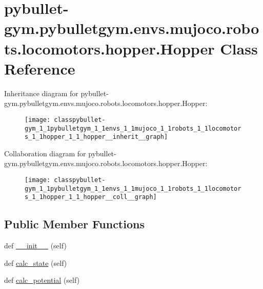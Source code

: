 \hypertarget{classpybullet-gym_1_1pybulletgym_1_1envs_1_1mujoco_1_1robots_1_1locomotors_1_1hopper_1_1_hopper}{}\section{pybullet-\/gym.pybulletgym.\+envs.\+mujoco.\+robots.\+locomotors.\+hopper.\+Hopper Class Reference}
\label{classpybullet-gym_1_1pybulletgym_1_1envs_1_1mujoco_1_1robots_1_1locomotors_1_1hopper_1_1_hopper}


Inheritance diagram for pybullet-\/gym.pybulletgym.\+envs.\+mujoco.\+robots.\+locomotors.\+hopper.\+Hopper\+:
\nopagebreak
\begin{figure}[H]
\begin{center}
\leavevmode
\texttt{[image: classpybullet-gym\_1\_1pybulletgym\_1\_1envs\_1\_1mujoco\_1\_1robots\_1\_1locomotors\_1\_1hopper\_1\_1\_hopper\_\_inherit\_\_graph]}
\end{center}
\end{figure}


Collaboration diagram for pybullet-\/gym.pybulletgym.\+envs.\+mujoco.\+robots.\+locomotors.\+hopper.\+Hopper\+:
\nopagebreak
\begin{figure}[H]
\begin{center}
\leavevmode
\texttt{[image: classpybullet-gym\_1\_1pybulletgym\_1\_1envs\_1\_1mujoco\_1\_1robots\_1\_1locomotors\_1\_1hopper\_1\_1\_hopper\_\_coll\_\_graph]}
\end{center}
\end{figure}
\subsection*{Public Member Functions}
\begin{DoxyCompactItemize}
\item 
def \hyperlink{classpybullet-gym_1_1pybulletgym_1_1envs_1_1mujoco_1_1robots_1_1locomotors_1_1hopper_1_1_hopper_a907b55928e3d1ecf61203b3efa8450da}{\+\_\+\+\_\+init\+\_\+\+\_\+} (self)
\item 
def \hyperlink{classpybullet-gym_1_1pybulletgym_1_1envs_1_1mujoco_1_1robots_1_1locomotors_1_1hopper_1_1_hopper_a949f738657a01292121417500d9b9e50}{calc\+\_\+state} (self)
\item 
def \hyperlink{classpybullet-gym_1_1pybulletgym_1_1envs_1_1mujoco_1_1robots_1_1locomotors_1_1hopper_1_1_hopper_aa4e12b06c711476d2ddf66367d1042cc}{calc\+\_\+potential} (self)
\end{DoxyCompactItemize}
